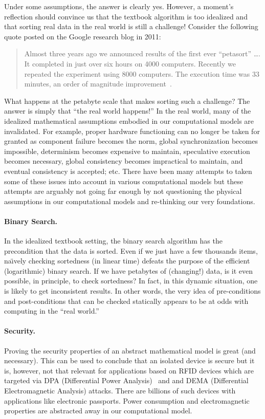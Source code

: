 \documentclass{article}
\begin{document}
Under some assumptions, the answer is clearly yes. However, a moment's
reflection should convince us that the textbook algorithm is too idealized
and that sorting real data in the real world is still a challenge!  Consider
the following quote posted on the Google research blog in 2011:
\begin{quote}
  Almost three years ago we announced results of the first ever ``petasort''
  \ldots . It completed in just over six hours on 4000 computers. Recently we
  repeated the experiment using 8000 computers. The execution time was 33
  minutes, an order of magnitude improvement~\cite{petasort}.
\end{quote}
What happens at the petabyte scale that makes sorting such a
challenge? The answer is simply that ``the real world happens!'' In
the real world, many of the idealized mathematical assumptions
embodied in our computational models are invalidated. For example,
proper hardware functioning can no longer be taken for granted as
component failure becomes the norm, global synchronization becomes
impossible, determinism becomes expensive to maintain, speculative
execution becomes necessary, global consistency becomes impractical to
maintain, and eventual consistency is accepted; etc. There have been
many attempts to taken some of these issues into account in various
computational models but these attempts are arguably not going far
enough by not questioning the physical assumptions in our
computational models and re-thinking our very foundations.

\paragraph*{Binary Search.} 
In the idealized textbook setting, the binary search algorithm has the
precondition that the data is sorted. Even if we just have a few thousands
items, na\"\i vely checking sortedness (in linear time) defeats the purpose of
the efficient (logarithmic) binary search. If we have petabytes of
(changing!) data, is it even possible, in principle, to check sortedness? In
fact, in this dynamic situation, one is likely to get inconsistent
results. In other words, the very idea of pre-conditions and post-conditions
that can be checked statically appears to be at odds with computing in the
``real world.''

\paragraph*{Security.} 
Proving the security properties of an abstract mathematical model is great
(and necessary). This can be used to conclude that an isolated device is
secure but it is, however, not that relevant for applications based on RFID
devices which are targeted via DPA (Differential Power Analysis)~\cite{dpa}
and and DEMA (Differential Electromagnetic Analysis) attacks. There are
billions of such devices with applications like electronic passports. Power
consumption and electromagnetic properties are abstracted away in our
computational model.
\end{document}
